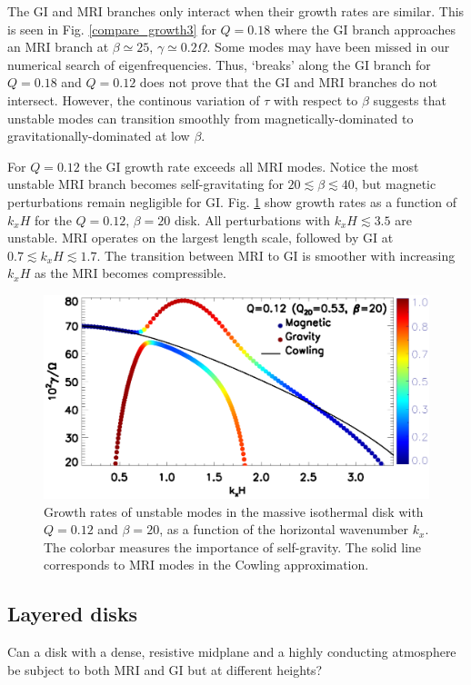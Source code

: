 The GI and MRI branches only interact when their growth rates
are similar. This is seen in Fig. \ref{compare_growth3} for $Q=0.18$
where the GI branch approaches an MRI branch at $\beta\simeq 25,\,
\gamma\simeq 0.2\Omega$. 
Some modes may have been missed in our
numerical search of eigenfrequencies. Thus, `breaks' along the
GI branch for $Q=0.18$ and $Q=0.12$ does not prove that the GI and MRI branches do not
intersect. However, the continous variation of $\tau$ with respect to
$\beta$ suggests that unstable modes can transition smoothly from
magnetically-dominated to gravitationally-dominated at low $\beta$.  

For $Q=0.12$ the GI growth rate exceeds all MRI modes. Notice the most
unstable MRI branch becomes self-gravitating for $20 \lesssim
\beta\lesssim 40$, but magnetic perturbations remain negligible
for GI. 
Fig. \ref{compare_growth3_Q01d2} show growth rates
as a function of $k_xH$ for the $Q=0.12,\,\beta=20$ disk. All
perturbations with $k_xH \lesssim 3.5$ are unstable. MRI operates on the largest
length scale, followed by GI at $0.7 \lesssim k_xH\lesssim 1.7$. The 
transition between MRI to GI is smoother with increasing $k_xH$ as the
MRI becomes compressible. 


\begin{figure}
  \includegraphics[width=\linewidth]{figures/compare_growth3_Q0d12_B20.ps}  
  \caption{Growth rates of unstable modes in the massive isothermal
    disk with $Q=0.12$ and $\beta=20$, as a function of the horizontal
    wavenumber $k_x$. The colorbar measures the importance of
    self-gravity. The solid line corresponds to MRI modes in the
    Cowling approximation. 
    \label{compare_growth3_Q01d2}}
\end{figure}


\subsection{Layered disks}
Can a disk with a dense, resistive midplane and a highly conducting
atmosphere  be subject to both MRI and GI but at different heights?  


